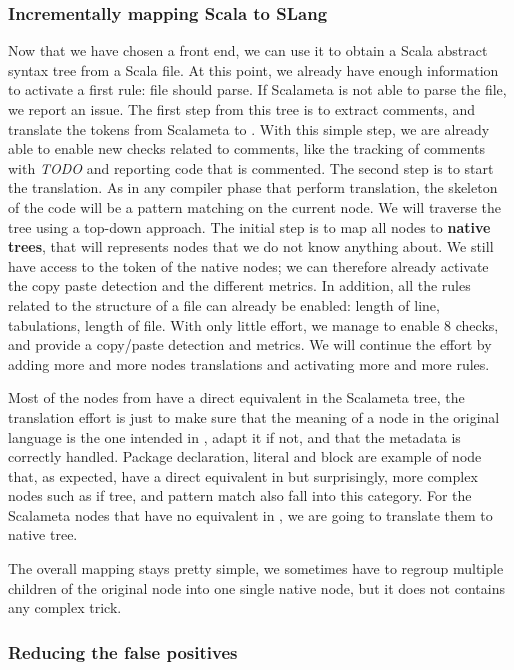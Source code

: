 \subsubsection{Incrementally mapping Scala to SLang}
\label{subsubsec:scala_to_slang}
Now that we have chosen a front end, we can use it to obtain a Scala abstract syntax tree from a Scala file. 
At this point, we already have enough information to activate a first rule: file should parse.
If Scalameta is not able to parse the file, we report an issue.
The first step from this tree is to extract comments, and translate the tokens from Scalameta to \slang{}.
With this simple step, we are already able to enable new checks related to comments, like the tracking of comments with \emph{TODO} and reporting code that is commented.
The second step is to start the translation. 
As in any compiler phase that perform translation, the skeleton of the code will be a pattern matching on the current node. 
We will traverse the tree using a top-down approach. 
The initial step is to map all nodes to \textbf{native trees}, that will represents nodes that we do not know anything about. 
We still have access to the token of the native nodes; we can therefore already activate the copy paste detection and the different metrics. 
In addition, all the rules related to the structure of a file can already be enabled: length of line, tabulations, length of file.
With only little effort, we manage to enable 8 checks, and provide a copy/paste detection and metrics. 
We will continue the effort by adding more and more nodes translations and activating more and more rules.

Most of the nodes from \slang{} have a direct equivalent in the Scalameta tree, the translation effort is just to make sure that the meaning of a node in
the original language is the one intended in \slang{}, adapt it if not, and that the metadata is correctly handled. Package declaration, literal and block are example of node that, as expected, have a direct equivalent in \slang{} but surprisingly, more complex nodes such as if tree, and pattern match also fall into this category. 
For the Scalameta nodes that have no equivalent in
\slang{}, we are going to translate them to native tree.

The overall mapping stays pretty simple, we sometimes have to regroup
multiple children of the original node into one single native node, but it does
not contains any complex trick.

\subsubsection{Reducing the false positives}
\label{subsubsec:reducing_false_positives}

